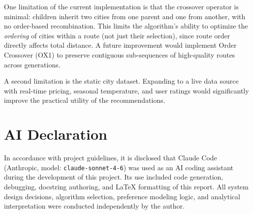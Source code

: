 \documentclass[12pt]{article}
\begin{document}
One limitation of the current implementation is that the crossover operator is minimal: children inherit two cities from one parent and one from another, with no order-based recombination. This limits the algorithm's ability to optimize the \textit{ordering} of cities within a route (not just their selection), since route order directly affects total distance. A future improvement would implement Order Crossover (OX1) to preserve contiguous sub-sequences of high-quality routes across generations.

A second limitation is the static city dataset. Expanding to a live data source with real-time pricing, seasonal temperature, and user ratings would significantly improve the practical utility of the recommendations.




\section*{AI Declaration}
In accordance with project guidelines, it is disclosed that Claude Code (Anthropic, model: \texttt{claude-sonnet-4-6}) was used as an AI coding assistant during the development of this project. Its use included code generation, debugging, docstring authoring, and LaTeX formatting of this report. All system design decisions, algorithm selection, preference modeling logic, and analytical interpretation were conducted independently by the author.
\end{document}
